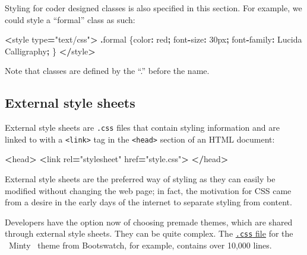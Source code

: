 \documentclass[
  openany]{book}
\newenvironment{Shaded}{\begin{snugshade}}{\end{snugshade}}
\newcommand{\AttributeTok}[1]{\textcolor[rgb]{0.77,0.63,0.00}{#1}}
\newcommand{\DataTypeTok}[1]{\textcolor[rgb]{0.13,0.29,0.53}{#1}}
\newcommand{\NormalTok}[1]{#1}
\newcommand{\OperatorTok}[1]{\textcolor[rgb]{0.81,0.36,0.00}{\textbf{#1}}}
\newcommand{\StringTok}[1]{\textcolor[rgb]{0.31,0.60,0.02}{#1}}
\begin{document}
Styling for coder designed classes is also specified in this section. For example, we could style a ``formal'' class as such:

\begin{Shaded}
\begin{Highlighting}[]
\OperatorTok{\textless{}}\NormalTok{style type}\OperatorTok{=}\StringTok{"text/css"}\OperatorTok{\textgreater{}}
    \OperatorTok{.}\AttributeTok{formal}\NormalTok{ \{}\DataTypeTok{color}\OperatorTok{:}\NormalTok{ red}\OperatorTok{;}        
\NormalTok{        font}\OperatorTok{{-}}\DataTypeTok{size}\OperatorTok{:}\NormalTok{ 30px}\OperatorTok{;}
\NormalTok{        font}\OperatorTok{{-}}\DataTypeTok{family}\OperatorTok{:}\NormalTok{ Lucida Calligraphy}\OperatorTok{;}
\NormalTok{        \}   }
\OperatorTok{\textless{}/}\NormalTok{style}\OperatorTok{\textgreater{}}
\end{Highlighting}
\end{Shaded}

Note that classes are defined by the ``.'' before the name.

\hypertarget{external-style-sheets}{%
\subsection{External style sheets}\label{external-style-sheets}}

External style sheets are \texttt{.css} files that contain styling information and are linked to with a \texttt{\textless{}link\textgreater{}} tag in the \texttt{\textless{}head\textgreater{}} section of an HTML document:

\begin{Shaded}
\begin{Highlighting}[]
\OperatorTok{\textless{}}\NormalTok{head}\OperatorTok{\textgreater{}}
    \OperatorTok{\textless{}}\NormalTok{link rel}\OperatorTok{=}\StringTok{"stylesheet"}\NormalTok{ href}\OperatorTok{=}\StringTok{"style.css"}\OperatorTok{\textgreater{}}
\OperatorTok{\textless{}/}\NormalTok{head}\OperatorTok{\textgreater{}}
\end{Highlighting}
\end{Shaded}

External style sheets are the preferred way of styling as they can easily be modified without changing the web page; in fact, the motivation for CSS came from a desire in the early days of the internet to separate styling from content.

Developers have the option now of choosing premade themes, which are shared through external style sheets. They can be quite complex. The \href{https://github.com/thomaspark/bootswatch/blob/master/docs/4/minty/bootstrap.css}{\texttt{.css} file} for the ~Minty~ theme from Bootswatch, for example, contains over 10,000 lines.
\end{document}
